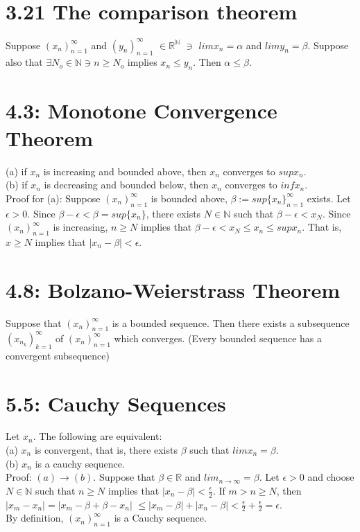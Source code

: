 \documentclass[10pt,letter]{report}
\begin{document}
\section*{3.21 The comparison theorem}
Suppose $(x_n)_{n=1}^\infty$ and $(y_n)_{n=1}^\infty$ $\in \mathbb{R}^\mathbb{N}$ $\ni$ $lim x_n = \alpha$ and $lim y_n = \beta$. Suppose also that $\exists N_o \in \mathbb{N} \ni n \geq N_o$ implies $x_n \leq y_n$. Then $\alpha \leq \beta$. \\ 

\section*{4.3: Monotone Convergence Theorem}
(a) if $x_n$ is increasing and bounded above, then $x_n$ converges to $sup{x_n}$.\\ 
(b) if $x_n$ is decreasing and bounded below, then $x_n$ converges to $inf{x_n}$.\\ 
Proof for (a): Suppose $(x_n)_{n=1}^\infty$ is bounded above, $\beta:= sup\{x_n\}_{n=1}^\infty$ exists. Let $\epsilon > 0$. Since $\beta - \epsilon < \beta = sup\{x_n\}$, there exists $N \in \mathbb{N}$ such that $\beta - \epsilon < x_N$. Since $(x_n)_{n=1}^\infty$ is increasing, $n \geq N$ implies that $\beta - \epsilon < x_N \leq x_n \leq sup{x_n}$. That is, $x \geq N$ implies that $|x_n - \beta| < \epsilon$. 

\section*{4.8: Bolzano-Weierstrass Theorem}
Suppose that $(x_n)_{n=1}^\infty$ is a bounded sequence. Then there exists a subsequence $(x_{n_k})_{k=1}^\infty$ of $(x_n)_{n=1}^\infty$ which converges.
(Every bounded sequence has a convergent subsequence)

\section*{5.5: Cauchy Sequences}
Let $x_n$. The following are equivalent: \\ 
(a) $x_n$ is convergent, that is, there exists $\beta$ such that $lim x_n = \beta$.\\ 
(b) $x_n$ is a cauchy sequence. \\ 
Proof: $(a) \rightarrow (b)$. Suppose that $\beta \in \mathbb{R}$ and $lim_{n\rightarrow\infty} = \beta$. Let $\epsilon > 0$ and choose $N \in \mathbb{N}$ such that $n \geq N$ implies that $|x_n - \beta| < \frac{\epsilon}{2}$. If $m > n \geq N$, then \\ 
$|x_m - x_n| = |x_m - \beta + \beta - x_n|$
$\leq |x_m - \beta| + |x_n - \beta| < \frac{\epsilon}{2} + \frac{\epsilon}{2} = \epsilon$. \\ 
By definition, $(x_n)_{n=1}^\infty$ is a Cauchy sequence. 
\end{document}
